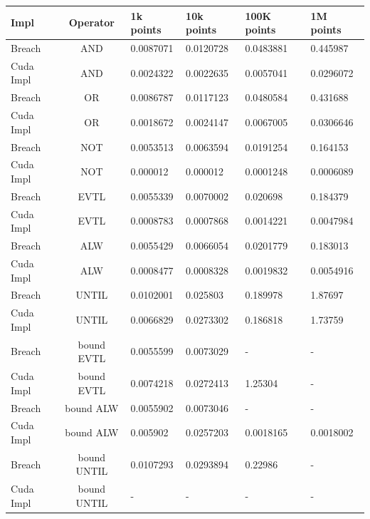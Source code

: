 \documentclass[a4paper,10pt]{article}
\begin{document}
\begin{center}
	\begin{tabular}{| l | c || l | l | l | l |}
	    \hline
	    Impl & Operator & 1k points & 10k points & 100K points & 1M points \\
	    \hline \hline
	    Breach & AND & 0.0087071 & 0.0120728 & 0.0483881 & 0.445987 \\
	    Cuda Impl & AND & 0.0024322 & 0.0022635 & 0.0057041 & 0.0296072 \\
	    \hline \hline
	    Breach & OR & 0.0086787 & 0.0117123 & 0.0480584 & 0.431688 \\
	    Cuda Impl & OR & 0.0018672 & 0.0024147 & 0.0067005 & 0.0306646 \\
	    \hline \hline   
	    Breach & NOT & 0.0053513 & 0.0063594 & 0.0191254 & 0.164153 \\
	    Cuda Impl & NOT & 0.000012 & 0.000012 & 0.0001248 & 0.0006089 \\
	    \hline \hline   
        Breach & EVTL & 0.0055339 & 0.0070002 & 0.020698 & 0.184379 \\
        Cuda Impl & EVTL & 0.0008783 & 0.0007868 & 0.0014221 & 0.0047984 \\
	    \hline \hline   
        Breach & ALW & 0.0055429 & 0.0066054 & 0.0201779 & 0.183013 \\
        Cuda Impl & ALW & 0.0008477 & 0.0008328 & 0.0019832 & 0.0054916 \\
	    \hline \hline   
        Breach & UNTIL & 0.0102001 & 0.025803 & 0.189978 & 1.87697 \\
        Cuda Impl & UNTIL & 0.0066829 & 0.0273302 & 0.186818 & 1.73759 \\        
	    \hline \hline   
        Breach & bound EVTL & 0.0055599 & 0.0073029 & - & - \\
        Cuda Impl & bound EVTL & 0.0074218 & 0.0272413 & 1.25304 & - \\        
	    \hline \hline   
        Breach & bound ALW & 0.0055902 & 0.0073046 & - & - \\
        Cuda Impl & bound ALW & 0.005902 & 0.0257203 & 0.0018165 & 0.0018002 \\        
	    \hline \hline   
        Breach & bound UNTIL & 0.0107293 & 0.0293894 & 0.22986 & - \\
        Cuda Impl & bound UNTIL & - & - & - & - \\        
	    \hline
	\end{tabular}
	\label{tab: bechmark results signal type1}
\end{center}
\end{document}
